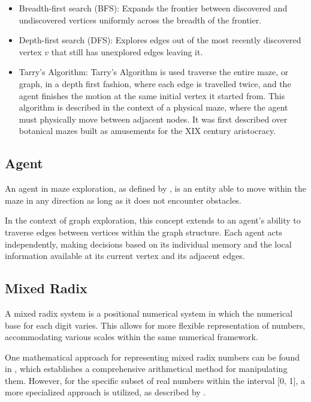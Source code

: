 \begin{itemize}
    \item Breadth-first search (BFS): Expands the frontier between discovered and undiscovered vertices uniformly across the breadth of the frontier. \cite{Manber1989}
    \item Depth-first search (DFS): Explores edges out of the most recently discovered vertex $v$ that still has unexplored edges leaving it. \cite{Manber1989}
    \item Tarry's Algorithm: Tarry's Algorithm is used traverse the entire maze, or graph, in a depth first fashion, where each edge is travelled twice, and the agent finishes the motion at the same initial vertex it started from.\cite{Kivelevitch2010} This algorithm is described in the context of a physical maze, where the agent must physically move between adjacent nodes.
    It was first described over botanical mazes built as amusements for the XIX century aristocracy.
\end{itemize}

\subsection{Agent}
\label{section_definitions_agent}

An agent in maze exploration, as defined by , 
is an entity able to move within the maze in any direction as long as it does not encounter obstacles.

In the context of graph exploration, this concept extends to an agent's ability to traverse
edges between vertices within the graph structure. Each agent acts independently,
making decisions based on its individual memory and the local information available at its current vertex and its adjacent edges.


\subsection{Mixed Radix}
\label{section_definitions_mixed_radix}

A mixed radix system is a positional numerical system in which the numerical base for each digit
varies. This allows for more flexible representation of numbers,
accommodating various scales within the same numerical framework.

One mathematical approach for representing mixed radix numbers can be found in ,
which establishes a comprehensive arithmetical method for manipulating them.  However,
for the specific subset of real numbers within the interval [0, 1], a more specialized approach is utilized, as described by .

